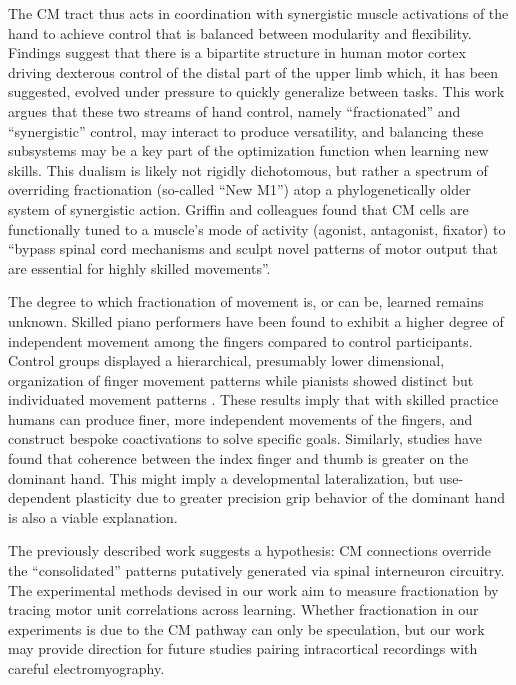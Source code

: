 \documentclass[../main.tex]{subfiles}
\begin{document}
The CM tract thus acts in coordination with synergistic muscle activations of the hand to achieve control that is balanced between modularity and flexibility. Findings suggest that there is a bipartite structure in human motor cortex driving dexterous control of the distal part of the upper limb which, it has been suggested, evolved under pressure to quickly generalize between tasks. This work argues that these two streams of hand control, namely ``fractionated'' and ``synergistic'' control, may interact to produce versatility, and balancing these subsystems may be a key part of the optimization function when learning new skills\cite{Rathelot2009,griffinCorticomotoneuronalCellsAre2015,Takei2017}. This dualism is likely not rigidly dichotomous, but rather a spectrum of overriding fractionation (so-called ``New M1'') atop a phylogenetically older system of synergistic action\cite{dumCorticospinalSystemStructural2011}. Griffin and colleagues found that CM cells are functionally tuned to a muscle's mode of activity (agonist, antagonist, fixator) to ``bypass spinal cord mechanisms and sculpt novel patterns of motor output that are essential for highly skilled movements''\cite{griffinCorticomotoneuronalCellsAre2015}. 

The degree to which fractionation of movement is, or can be, learned remains unknown. Skilled piano performers have been found to exhibit a higher degree of independent movement among the fingers compared to control participants. Control groups displayed a hierarchical, presumably lower dimensional, organization of finger movement patterns while pianists showed distinct but individuated movement patterns \cite{furuyaFlexibilityMovementOrganization2013}. These results imply that with skilled practice humans can produce finer, more independent movements of the fingers, and construct bespoke coactivations to solve specific goals. Similarly, studies have found that coherence between the index finger and thumb is greater on the dominant hand. This might imply a developmental lateralization, but use-dependent plasticity due to greater precision grip behavior of the dominant hand is also a viable explanation\cite{fuglevandMechanicalPropertiesNeural2011}.

The previously described work suggests a hypothesis: CM connections override the ``consolidated'' patterns putatively generated via spinal interneuron circuitry. The experimental methods devised in our work aim to measure fractionation by tracing motor unit correlations across learning. Whether fractionation in our experiments is due to the CM pathway can only be speculation, but our work may provide direction for future studies pairing intracortical recordings with careful electromyography.
\end{document}
